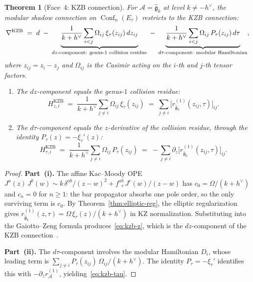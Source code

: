 \documentclass[11pt]{article}
\theoremstyle{plain}
\newtheorem{theorem}{Theorem}[section]
\theoremstyle{definition}
\theoremstyle{remark}
\newcommand{\fg}{\mathfrak{g}}
\newcommand{\cA}{\mathcal{A}}
\DeclareMathOperator{\Conf}{Conf}
\numberwithin{equation}{section}
\begin{document}
\begin{theorem}[Face~4: KZB connection]\label{thm:kzb}
For $\cA = \widehat{\fg}_k$ at level $k \neq -h^\vee$, the modular
shadow connection on $\Conf_n(E_\tau)$ restricts to the KZB
connection:
\begin{equation}\label{eq:kzb-full}
\nabla^{\mathrm{KZB}}
\;=\;
d
\;-\;
\underbrace{
\frac{1}{k+h^\vee}
\sum_{i<j}\Omega_{ij}\,\xi_\tau(z_{ij})\,dz_{ij}
}_{\textup{$dz$-component: genus-$1$ collision residue}}
\;-\;
\underbrace{
\frac{1}{k+h^\vee}
\sum_{i<j}\Omega_{ij}\,P_\tau(z_{ij})\,d\tau
}_{\textup{$d\tau$-component: modular Hamiltonian}},
\end{equation}
where $z_{ij} = z_i - z_j$ and $\Omega_{ij}$ is the Casimir acting
on the $i$-th and $j$-th tensor factors.
\begin{enumerate}[label=\textup{(\roman*)}]
\item The $dz$-component equals the genus-$1$ collision residue:
\begin{equation}\label{eq:kzb-z}
H_{z,i}^{\mathrm{KZB}}
\;=\;
\frac{1}{k+h^\vee}\sum_{j \neq i}\Omega_{ij}\,\xi_\tau(z_{ij})
\;=\;
\sum_{j \neq i}
\bigl[r_{\widehat{\fg}_k}^{(1)}(z_{ij},\tau)\bigr]_{ij}.
\end{equation}
\item The $d\tau$-component equals the $z$-derivative of the collision
residue, through the identity $P_\tau(z)=-\xi_\tau'(z)$:
\begin{equation}\label{eq:kzb-tau}
H_{\tau,i}^{\mathrm{KZB}}
\;=\;
\frac{1}{k+h^\vee}\sum_{j \neq i}\Omega_{ij}\,P_\tau(z_{ij})
\;=\;
-\sum_{j \neq i}
\partial_z\bigl[r_{\widehat{\fg}_k}^{(1)}(z_{ij},\tau)\bigr]_{ij}.
\end{equation}
\end{enumerate}
\end{theorem}

\begin{proof}
\textbf{Part~(i).} The affine Kac--Moody OPE
$J^a(z)\,J^b(w) \sim k\,\delta^{ab}/(z-w)^2 +
f^{ab}_{\;\;c}\,J^c(w)/(z-w)$ has $c_0 = \Omega/(k+h^\vee)$
and $c_n = 0$ for $n \geq 1$: the bar propagator absorbs one pole
order, so the only surviving term is $c_0$. By
Theorem~\ref{thm:elliptic-reg}, the elliptic regularization gives
$r_{\widehat{\fg}_k}^{(1)}(z,\tau) = \Omega\,\xi_\tau(z)/(k+h^\vee)$
in KZ normalization.
Substituting into the Gaiotto--Zeng formula produces~\eqref{eq:kzb-z},
which is the $dz$-component of the KZB
connection~\cite{Bernard88,KZB95}.

\textbf{Part~(ii).} The $d\tau$-component involves the modular
Hamiltonian $D_i$, whose leading term is
$\sum_{j \neq i}P_\tau(z_{ij})\,\Omega_{ij}/(k+h^\vee)$. The
identity \(P_\tau=-\xi_\tau'\) identifies this
with $-\partial_z r_\cA^{(1)}$, yielding~\eqref{eq:kzb-tau}.
\end{proof}
\end{document}
